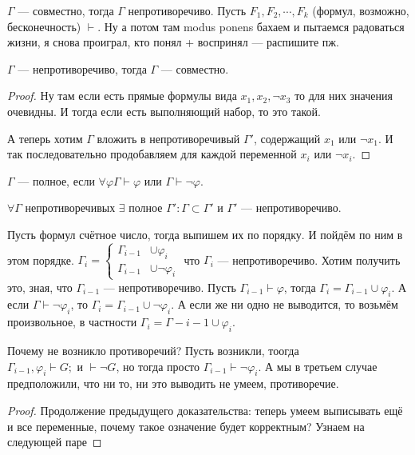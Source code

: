 \begin{statement}
	$\Gamma$ --- совместно, тогда $\Gamma$ непротиворечиво. Пусть $F_1, F_2, \cdots, F_k$ (формул, возможно, бесконечность) $\vdash$. Ну а потом там modus ponens бахаем и пытаемся радоваться жизни, я снова проиграл, кто понял + воспринял --- распишите пж.
\end{statement}
\begin{statement}
	$\Gamma$ --- непротиворечиво, тогда $\Gamma$ --- совместно. 
\end{statement}
\begin{proof}
	Ну там если есть прямые формулы вида $x_1, x_2, \lnot x_3$ то для них значения очевидны. И тогда если есть выполняющий набор, то это такой.

	А теперь хотим $\Gamma$ вложить в непротиворечивый $\Gamma'$, содержащий $x_1$ или $\lnot x_1$. И так последовательно продобавляем для каждой переменной $x_i$ или $\lnot x_i$. 
\end{proof}
\begin{definition}
	$\Gamma$ --- полное, если $\forall \varphi \Gamma \vdash \varphi$ или $\Gamma \vdash \lnot \varphi$.
\end{definition}
\begin{statement}
	$\forall \Gamma $ непротиворечивых $\exists$ полное $\Gamma': \Gamma \subset \Gamma'$ и $\Gamma'$ --- непротиворечиво.

	Пусть формул счётное число, тогда выпишем их по порядку. И пойдём по ним в этом порядке. $\Gamma_{i} = \left\{ \begin{aligned} \Gamma_{i-1} &\cup \varphi_i \\ \Gamma_{i-1} &\cup \lnot \varphi_i \end{aligned} \right.$ что $\Gamma_{i}$ --- непротиворечиво. Хотим получить это, зная, что $\Gamma_{i-1}$ --- непротиворечиво. Пусть $\Gamma_{i-1} \vdash \varphi$, тогда $\Gamma_i = \Gamma_{i-1} \cup \varphi_i$. А если $\Gamma \vdash \lnot \varphi_i$, то $\Gamma_i = \Gamma_{i-1} \cup \lnot \varphi_i$. А если же ни одно не выводится, то возьмём произвольное, в частности $\Gamma_i = \Gamma-{i-1} \cup \varphi_i$. 

	Почему не возникло противоречий? Пусть возникли, тоогда $\Gamma_{i-1}, \varphi_i \vdash G; \text{ и } \vdash \lnot G$, но тогда просто $\Gamma_{i-1} \vdash \lnot \varphi_i$. А мы в третьем случае предположили, что ни то, ни это выводить не умеем, противоречие. 
\end{statement}

\begin{proof}
	Продолжение предыдущего доказательства: теперь умеем выписывать ещё и все переменные, почему такое означение будет корректным? Узнаем на следующей паре
\end{proof}
